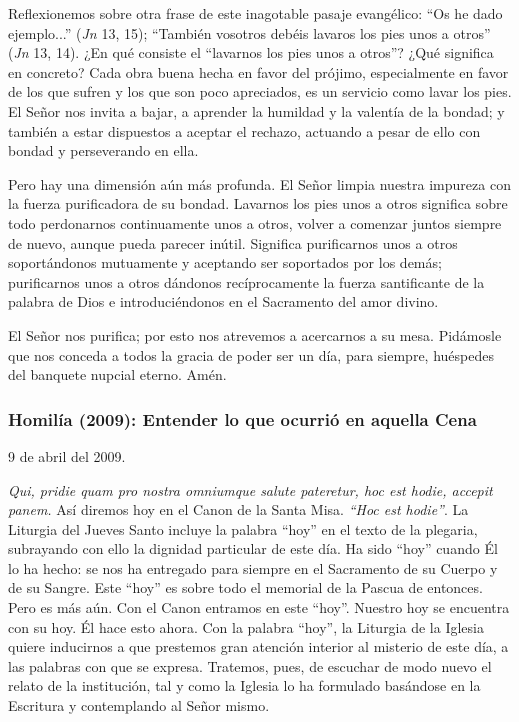 			\begin{body}Reflexionemos sobre otra frase de este inagotable pasaje evangélico: “Os he dado ejemplo...” (\textit{Jn} 13, 15); “También vosotros debéis lavaros los pies unos a otros” (\textit{Jn} 13, 14). ¿En qué consiste el “lavarnos los pies unos a otros”? ¿Qué significa en concreto? Cada obra buena hecha en favor del prójimo, especialmente en favor de los que sufren y los que son poco apreciados, es un servicio como lavar los pies. El Señor nos invita a bajar, a aprender la humildad y la valentía de la bondad; y también a estar dispuestos a aceptar el rechazo, actuando a pesar de ello con bondad y perseverando en ella.\end{body}
			
			\begin{body}Pero hay una dimensión aún más profunda. El Señor limpia nuestra impureza con la fuerza purificadora de su bondad. Lavarnos los pies unos a otros significa sobre todo perdonarnos continuamente unos a otros, volver a comenzar juntos siempre de nuevo, aunque pueda parecer inútil. Significa purificarnos unos a otros soportándonos mutuamente y aceptando ser soportados por los demás; purificarnos unos a otros dándonos recíprocamente la fuerza santificante de la palabra de Dios e introduciéndonos en el Sacramento del amor divino.\end{body}
			
			\begin{body}El Señor nos purifica; por esto nos atrevemos a acercarnos a su mesa. Pidámosle que nos conceda a todos la gracia de poder ser un día, para siempre, huéspedes del banquete nupcial eterno. Amén.\end{body}
			
			\subsubsection{Homilía (2009): Entender lo que ocurrió en aquella Cena}
			
			\begin{referencia}9 de abril del 2009.\end{referencia}
			
			\begin{body}\textit{Qui, pridie quam pro nostra omniumque salute pateretur, hoc est hodie, accepit panem. }Así diremos hoy en el Canon de la Santa Misa. \textit{“Hoc est hodie”}. La Liturgia del Jueves Santo incluye la palabra “hoy” en el texto de la plegaria, subrayando con ello la dignidad particular de este día. Ha sido “hoy” cuando Él lo ha hecho: se nos ha entregado para siempre en el Sacramento de su Cuerpo y de su Sangre. Este “hoy” es sobre todo el memorial de la Pascua de entonces. Pero es más aún. Con el Canon entramos en este “hoy”. Nuestro hoy se encuentra con su hoy. Él hace esto ahora. Con la palabra “hoy”, la Liturgia de la Iglesia quiere inducirnos a que prestemos gran atención interior al misterio de este día, a las palabras con que se expresa. Tratemos, pues, de escuchar de modo nuevo el relato de la institución, tal y como la Iglesia lo ha formulado basándose en la Escritura y contemplando al Señor mismo.\end{body}
			

